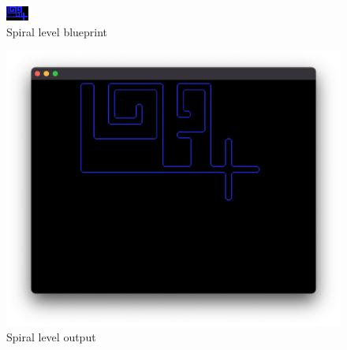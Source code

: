 \begin{figure}[H]
	\centering
	\includegraphics[width=0.6\linewidth]{Image-9.png}
	\caption {Spiral level blueprint\autocite{myself}}\label{SpiralLevel}
\end{figure}
\begin{figure}[H]
	\centering
	\includegraphics[width=0.8\linewidth]{Image-10.png}
	\caption {Spiral level output\autocite{myself}}\label{SpiralLevelOutcome}
\end{figure}
